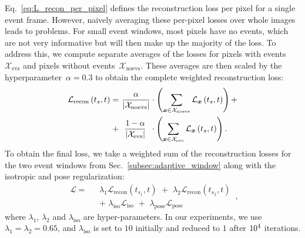 Eq.~\eqref{eq:L_recon_per_pixel} defines the reconstruction loss per pixel for a single event frame. However, naively averaging these per-pixel losses over whole images leads to problems. For small event windows, most pixels have no events, which are not very informative but will then make up the majority of the loss. 
To address this, we compute separate averages of the losses for pixels with events~$\mathcal{X}_\text{evs}$ and pixels without events~$\mathcal{X}_\text{noevs}$. 
These averages are then scaled by the hyperparameter~$\alpha=0.3$ to obtain the complete weighted reconstruction loss:
\begin{equation}
    \begin{split}
        \mathcal{L}_{\text{recon}}\left(t_s, t\right) = \,\,&
        \frac{\alpha}{|\mathcal{X}_{\text{noevs}}|} \cdot 
        \left(\sum_{\boldsymbol{x}\in \mathcal{X}_{\text{noevs}}} \mathcal{L}_{\boldsymbol{x}}\left(t_s, t\right)\right) + \\
        + \,\,& \,\, \frac{1 - \alpha}{|\mathcal{X}_{\text{evs}}|} \,\,\, \cdot 
        \left(\sum_{\boldsymbol{x}\in \mathcal{X}_{\text{evs}}} \mathcal{L}_{\boldsymbol{x}}\left(t_s, t\right)\right). 
    \end{split}
    \label{eq:L_recon}
\end{equation}
To obtain the final loss, we take a weighted sum of the reconstruction losses for the two event windows from Sec.~\ref{subsec:adaptive_window} along with the isotropic and pose regularization: 
\begin{equation}
    \begin{split}
        \mathcal{L} =\,\,\,\, & 
        \lambda_1 \mathcal{L}_{\text{recon}}\left(t_{s_1}, t\right) \,\,+  \,\,
        \lambda_2 \mathcal{L}_{\text{recon}}\left(t_{s_2}, t\right)  \\&
        +\,\, \lambda_\text{iso} \mathcal{L}_{\text{iso}} \,\,+ \,\,
        \lambda_\text{pose} \mathcal{L}_{\text{pose}}
    \end{split}
    \label{eq:loss} \mathrm{\,,}
\end{equation}
where $\lambda_1$, $\lambda_2$ and $\lambda_{\text{iso}}$ are hyper-parameters. In our experiments, we use  $\lambda_1=\lambda_2=0.65$, and $\lambda_{\text{iso}}$ is set to $10$ initially and reduced to $1$ after $\qty{d4}{}$ iterations. 





